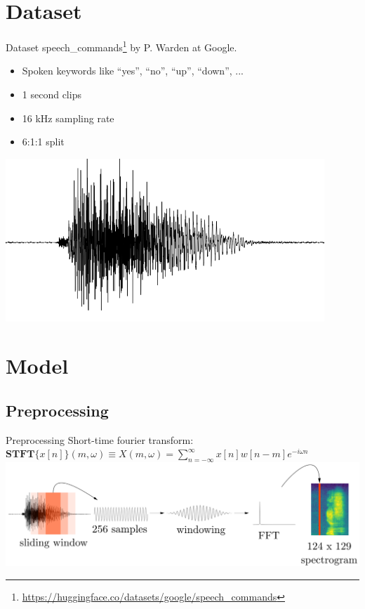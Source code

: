 \documentclass{beamer}
\begin{document}
\section{Dataset}
\begin{frame}{Dataset}
	speech\_commands\footnote{\url{https://huggingface.co/datasets/google/speech_commands}} by P. Warden at Google.\vspace{10mm}

\begin{minipage}{0.5\textwidth}

	\begin{itemize}
		\item<2-> Spoken keywords like ``yes'', ``no'', ``up'', ``down'', ...
		\item<3-> 1 second clips
		\item<4-> 16 kHz sampling rate
		\item<5-> 6:1:1 split
	\end{itemize}
	\end{minipage}
	\begin{minipage}{0.48\textwidth}
		\includegraphics[width=0.9\textwidth]{figures/wave.png}
	\end{minipage}

\end{frame}

\section{Model}
\subsection{Preprocessing}
\begin{frame}{Preprocessing}
	Short-time fourier transform:\\[2mm]

$\mathbf{STFT}\{x[n]\}(m,\omega)\equiv X(m,\omega) =
\sum_{n=-\infty}^{\infty} x[n]w[n-m]e^{-i \omega n}$
	\includegraphics[width=\textwidth]{figures/stft.png}
\end{frame}
\end{document}
